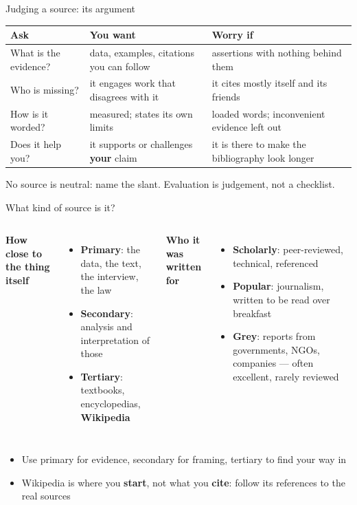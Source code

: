 \documentclass[aspectratio=169]{beamer}
\begin{document}
\begin{frame}{Judging a source: its argument}
\small
\begin{tabular}{@{}p{}p{}p{}@{}}
\toprule
\textbf{Ask} & \textbf{You want} & \textbf{Worry if} \\
\midrule
What is the evidence? & data, examples, citations you can follow
                      & assertions with nothing behind them \\
\addlinespace
Who is missing?       & it engages work that disagrees with it
                      & it cites mostly itself and its friends \\
\addlinespace
How is it worded?     & measured; states its own limits
                      & loaded words; inconvenient evidence left out \\
\addlinespace
Does it help you?     & it supports or challenges \textbf{your} claim
                      & it is there to make the bibliography look longer \\
\bottomrule
\end{tabular}
\vspace{1ex}

No source is neutral: name the slant.  Evaluation is judgement, not a checklist.
\end{frame}

\begin{frame}{What kind of source is it?}
\begin{columns}[T,onlytextwidth]
\textbf{How close to the thing itself}
\begin{itemize}
  \item \textbf{Primary}: the data, the text, the interview, the law
  \item \textbf{Secondary}: analysis and interpretation of those
  \item \textbf{Tertiary}: textbooks, encyclopedias, \textbf{Wikipedia}
\end{itemize}

\textbf{Who it was written for}
\begin{itemize}
  \item \textbf{Scholarly}: peer-reviewed, technical, referenced
  \item \textbf{Popular}: journalism, written to be read over breakfast
  \item \textbf{Grey}: reports from governments, NGOs, companies --- often
    excellent, rarely reviewed
\end{itemize}
\end{columns}
\vspace{2ex}
\begin{itemize}
  \item Use primary for evidence, secondary for framing, tertiary to find your way in
  \item Wikipedia is where you \textbf{start}, not what you \textbf{cite}:
    follow its references to the real sources
\end{itemize}
\end{frame}
\end{document}
